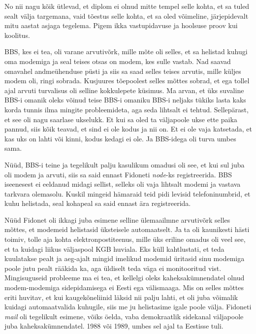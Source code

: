 
No nii nagu kõik ütlevad, et diplom ei olnud mitte tempel selle 
kohta, et sa tuled sealt välja targemana, vaid tõestus selle kohta, et sa 
oled võimeline, järjepidevalt mitu aastat asjaga tegelema. Pigem ikka 
vastupidavuse ja hoolsuse proov kui koolitus.


BBS, kes ei tea, oli varane  arvutivõrk, mille mõte oli selles, et sa helistad 
kuhugi oma modemiga ja seal teises otsas on modem, kes sulle vastab. Nad saavad 
omavahel andmeühenduse püsti ja siis sa saad selles teises arvutis, mille 
küljes modem oli, ringi sobrada. Kusjuures tõepoolest selles mõttes 
sobrad, et ega tollel ajal arvuti turvalisus oli selline kokkulepete 
küsimus. Ma arvan, et  üks suvaline BBS-i omanik oleks võinud teise 
BBS-i omaniku BBS-i neljaks tükiks  lasta kaks korda tunnis ilma mingite 
probleemideta, aga seda lihtsalt ei tehtud. Sellepärast, et see oli nagu 
saarlase ukselukk. Et kui sa oled ta väljapoole ukse ette paika pannud, siis kõik 
teavad, et sind ei ole kodus ja nii on. Et ei ole vaja katsetada, et kas uks 
on lahti või kinni, kodus kedagi ei ole. Ja BBS-idega oli  turva umbes sama. 

Nüüd, BBS-i teine ja tegelikult palju kasulikum omadusi oli see, et kui sul juba 
oli modem ja arvuti, siis sa said ennast Fidoneti 
\emph{node}-ks registreerida. BBS iseenesest ei eeldanud midagi sellist, selleks oli vaja lihtsalt 
modemi ja vastava tarkvara olemasolu. Kuskil mingeid hämaraid teid pidi levisid 
telefoninumbrid, et kuhu helistada, seal kohapeal sa 
said ennast ära registreerida.

Nüüd Fidonet oli ikkagi juba esimene selline ülemaailmne arvutivõrk selles 
mõttes, et modemeid helistasid üksteisele automaatselt. Ja ta oli kaunikesti 
hästi toimiv,  tolle aja kohta elektronpostiteenus, mille üks  eriline omadus 
oli veel see, et ta kuidagi liikus väljaspool KGB huviala. Eks küll 
kahtlustati, et teda kuulatakse pealt ja aeg-ajalt mingid imelikud modemid 
üritasid sinu modemiga poole jutu pealt rääkida ka, aga üldiselt teda väga ei 
monitooritud vist. Mingisuguseid probleeme ma ei tea, et kellelgi oleks 
kaheksakümnendatel olnud modem-modemiga sidepidamisega ei Eesti ega 
välismaaga. Mis on selles mõttes eriti huvitav, et  kui kaugekõneliinid läksid 
 nii palju lahti, et oli juba võimalik kuidagi automaatvalida 
kuhugile, siis me ju helistasime igale poole välja.  
Fidoneti \emph{mail} oli tegelikult  esimene, võiks öelda, vaba 
demokraatlik sidekanal väljapoole juba kaheksakümnendatel. 1988 või 1989, umbes sel ajal ta Eestisse tuli.

